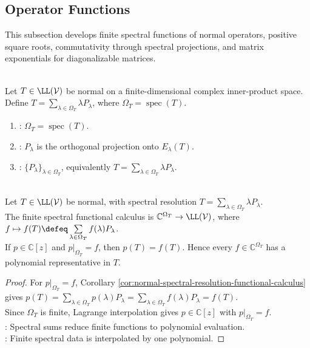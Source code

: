 \subsection{Operator Functions}


%

This subsection develops finite spectral functions of normal operators, positive square roots, commutativity through spectral projections, and matrix exponentials for diagonalizable matrices.

\begin{definition} \label{def:normal-spectral-resolution-notation} \\
Let $T\in\LL(\mathcal{V})$ be normal on a finite-dimensional complex inner-product space.\\
Define $T=\sum\limits_{\lambda\in\Omega_T}\lambda P_{\lambda}$, where $\Omega_T=\operatorname{spec}(T)$.
\begin{enumerate}[label=(\roman*)]
\setlength{\itemsep}{0pt}
\item {}: $\Omega_T=\operatorname{spec}(T)$.
\item {}: $P_{\lambda}$ is the orthogonal projection onto $E_{\lambda}(T)$.
\item {}: $\{P_{\lambda}\}_{\lambda\in\Omega_T}$, equivalently $T=\sum\limits_{\lambda\in\Omega_T}\lambda P_{\lambda}$.
\end{enumerate}
\end{definition}

\begin{theorem} \label{thm:finite-spectral-functional-calculus-normal} \\
Let $T\in\LL(\mathcal{V})$ be normal, with spectral resolution $T=\sum\limits_{\lambda\in\Omega_T}\lambda P_{\lambda}$.\\
The finite spectral functional calculus is $\mathbb{C}^{\Omega_T}\to\LL(\mathcal{V})$, where $f\mapsto f(T)\defeq\sum\limits_{\lambda\in\Omega_T}f(\lambda)P_{\lambda}$.\\
If $p\in\mathbb{C}[z]$ and $p|_{\Omega_T}=f$, then $p(T)=f(T)$. Hence every $f\in\mathbb{C}^{\Omega_T}$ has a polynomial representative in $T$.
\begin{proof}
For $p|_{\Omega_T}=f$, Corollary \ref{cor:normal-spectral-resolution-functional-calculus} gives $p(T)=\sum\limits_{\lambda\in\Omega_T}p(\lambda)P_{\lambda} =\sum\limits_{\lambda\in\Omega_T}f(\lambda)P_{\lambda} =f(T)$.\\
Since $\Omega_T$ is finite, Lagrange interpolation gives $p\in\mathbb{C}[z]$ with $p|_{\Omega_T}=f$.\\
: Spectral sums reduce finite functions to polynomial evaluation.\\
: Finite spectral data is interpolated by one polynomial.
\end{proof}
\end{theorem}


